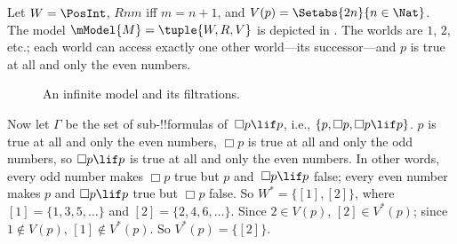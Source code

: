\documentclass[../../../include/open-logic-section]{subfiles}
\begin{document}
\begin{ex}
  Let $W = \PosInt$, $Rnm$ iff $m = n + 1$, and $V(p) = \Setabs{2n}{n \in
    \Nat}$. The model $\mModel{M} = \tuple{W, R, V}$ is depicted in
  . The worlds are $1$, $2$, etc.; each
  world can access exactly one other world---its successor---and $p$ is
  true at all and only the even numbers.

  \begin{figure}
    \centering

    \caption{An infinite model and its filtrations.}
  \end{figure}
  
  Now let $\Gamma$ be the set of sub-!!{formula}s of~$\Box p \lif p$,
  i.e., $\{p, \Box p, \Box p \lif p\}$. $p$ is true at all and only
  the even numbers, $\Box p$ is true at all and only the odd numbers,
  so $\Box p \lif p$ is true at all and only the even numbers. In
  other words, every odd number makes $\Box p$ true but $p$ and~$\Box
  p \lif p$ false; every even number makes $p$ and $\Box p \lif p$
  true but $\Box p$ false. So $W^* = \{ [1], [2] \}$, where $[1] =
  \{1, 3, 5, \dots\}$ and $[2] = \{2, 4, 6, \dots\}$. Since $2 \in
  V(p)$, $[2] \in V^*(p)$; since $1 \notin V(p)$, $[1] \notin
  V^*(p)$. So $V^*(p) = \{[2]\}$.


\end{ex}
\end{document}
